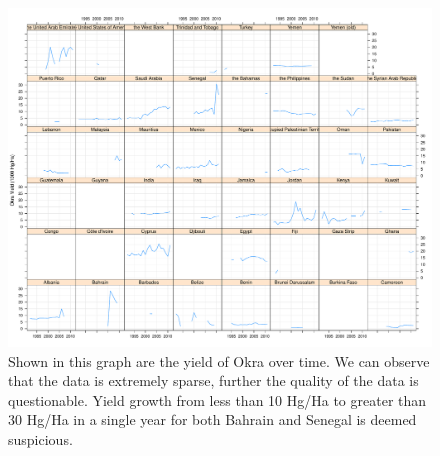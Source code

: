 \documentclass[nojss]{jss}\usepackage[]{graphicx}\usepackage[]{color}
\makeatletter
\def\maxwidth{ %
  \ifdim\Gin@nat@width>\linewidth
    \linewidth
  \else
    \Gin@nat@width
  \fi
}
\newenvironment{knitrout}{}{} %
\makeatother
\begin{document}
\begin{knitrout}
\color{fgcolor}\begin{figure}[!ht]


{\centering \includegraphics[width=\maxwidth]{figure/okra-yield-explore} 

}

\caption[Shown in this graph are the yield of Okra over time]{Shown in this graph are the yield of Okra over time. We can observe that the data is extremely sparse, further the quality of the data is questionable. Yield growth from less than 10 Hg/Ha to greater than 30 Hg/Ha in a single year for both Bahrain and Senegal is deemed suspicious.\label{fig:okra-yield-explore}}
\end{figure}


\end{knitrout}
\end{document}
